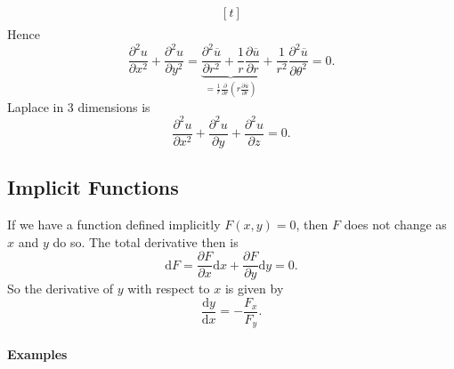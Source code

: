 \documentclass[12pt]{report}
\theoremstyle{definition}
\begin{document}
\begin{enumerate}[label = (\roman*)]
\[\begin{align*}
\begin{aligned}[t]
        \end{aligned}
    \end{align*}
\]
Hence\[
    \frac{\partial^{2}u}{\partial x^{2}} + \frac{\partial^{2}u}{\partial y^{2}}
    = \underbrace{\frac{\partial^{2}\overline{u}}{\partial r^{2}} + \frac{1}{r}
    \frac{\partial \overline{u}}{\partial r}}_\text{$=\frac{1}{r}\frac{\partial}{\partial r} 
\left(r\frac{\partial \overline{u}}{\partial r} \right) $} 
    + \frac{1}{r^{2}} \frac{\partial^{2}\overline{u}}{\partial \theta^{2}} = 0.
\]
Laplace in 3 dimensions is\[
    \frac{\partial^{2}u}{\partial x^{2}} + \frac{\partial^{2}u}{\partial y} + \frac{\partial^{2}u}{\partial z} = 0.
\]
\end{enumerate}

\subsection{Implicit Functions}

If we have a function defined implicitly $F(x,y) = 0$,
then $F$ does not change as $x$ and $y$ do so.
The total derivative then is\[
    \mathrm{d}F = \frac{\partial F}{\partial x} \mathrm{d}x + \frac{\partial F}{\partial y} \mathrm{d}y = 0.
\]So the derivative of $y$ with respect to $x$ is given by\[
    \frac{\mathrm{d}y}{\mathrm{d}x} = -\frac{F_x}{F_y}.
\]

\paragraph{Examples}
\,
\end{document}

